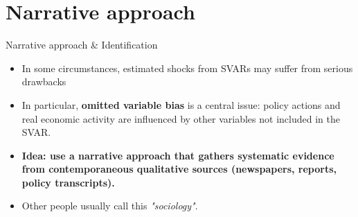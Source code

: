 \documentclass{beamer}
\begin{document}
\section{Narrative approach}


\begin{frame}{Narrative approach \& Identification}
\small

\begin{itemize}
\item In some circumstances, estimated shocks from SVARs may suffer from serious drawbacks
\item In particular, \textbf{omitted variable bias} is a central issue: policy actions and real economic activity are influenced by other variables not included in the SVAR.
\item \textbf{Idea: use a narrative approach that gathers systematic evidence from contemporaneous qualitative sources (newspapers, reports, policy transcripts).
} \pause
\item Other people usually call this \textit{"sociology"}.
\end{itemize}


\end{frame}
\end{document}
